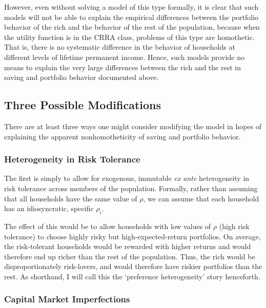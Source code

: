 \documentclass[12pt]{article}
\begin{document}
However, even without solving a model of this type formally, it is clear
that such models will not be able to explain the empirical differences
between the portfolio behavior of the rich and the behavior of the rest of
the population, because when the utility function is in the CRRA class,
problems of this type are homothetic. That is, there is no systematic
difference in the behavior of households at different levels of lifetime
permanent income. Hence, such models provide no means to explain the very
large differences between the rich and the rest in saving and portfolio
behavior documented above.

\subsection{Three Possible Modifications}

There are at least three ways one might consider modifying the model in
hopes of explaining the apparent nonhomotheticity of saving and portfolio
behavior.

\subsubsection{Heterogeneity in Risk Tolerance}

The first is simply to allow for exogenous, immutable \textit{ex ante}
heterogeneity in risk tolerance across members of the population. Formally,
rather than assuming that all households have the same value of $\rho$, we
can assume that each household has an idiosyncratic, specific $\rho_{i}$.

The effect of this would be to allow households with low values of $\rho$
(high risk tolerance) to choose highly risky but high-expected-return
portfolios. On average, the risk-tolerant households would be rewarded with
higher returns and would therefore end up richer than the rest of the
population. Thus, the rich would be disproportionately risk-lovers, and
would therefore have riskier portfolios than the rest. As shorthand, I will
call this the `preference heterogeneity' story henceforth.

\subsubsection{Capital Market Imperfections}
\end{document}
